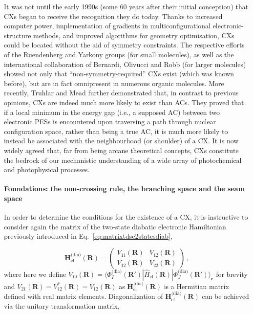 \documentclass[9pt,bestpractices]{livecoms}
\newcommand{\R}{\mathbf{R}}
\newcommand{\Rprime}{\mathbf{R'}}
\newcommand{\re}{\mathbf{r}}
\begin{document}
It was not until the early 1990s (some 60 years after their initial conception) that CXs began to receive the recognition they do today.\cite{domcke_front_2004}
Thanks to increased computer power, implementation of gradients in multiconfigurational electronic-structure methods, and improved algorithms for geometry optimisation, CXs could be located without the aid of symmetry constraints.\cite{lipkowitz_conical_2007}
The respective efforts of the Ruendenberg\cite{atchity_potential_1991, xantheas_potential_1991} and Yarkony\cite{riad_manaa_noncrossing_1990} groups (for small molecules), as well as the international collaboration of Bernardi, Olivucci and Robb\cite{bernardi_mechanism_1990, bernardi_predicting_1990} (for larger molecules) showed not only that ``non-symmetry-required'' CXs exist (which was known before), but are in fact omnipresent in numerous organic molecules.\cite{domcke_role_2012} 
More recently, Truhlar and Mead\cite{truhlar_relative_2003} further demonstrated that, in contrast to previous opinions, CXs are indeed much more likely to exist than ACs. 
They proved that if a local minimum in the energy gap (i.e., a supposed AC) between two electronic PESs is encountered upon traversing a path through nuclear configuration space, rather than being a true AC, it is much more likely to instead be associated with the neighbourhood (or shoulder) of a CX. 
It is now widely agreed that, far from being arcane theoretical concepts,\cite{zhu_non-adiabaticity_2016,boeije_one-mode_2023} CXs constitute the bedrock of our mechanistic understanding of a wide array of photochemical and photophysical processes.\cite{gonzalez2012progress,domcke_role_2012,gozem2017theory,10.1039/9781782626954-00016,blancafort_photochemistry_2014,levine2019conical}

\paragraph{Foundations: the non-crossing rule, the branching space and the seam space}
\label{ch2_non-cross_branch_seam}

In order to determine the conditions for the existence of a CX, it is instructive to consider again the matrix of the two-state diabatic electronic Hamiltonian previously introduced in Eq.~\eqref{eq:matrixtdse2statesdiab},\cite{matsika_electronic_2021} 

\begin{equation}
\label{dia_elec_ham}  
    \mathbf{H}_{\text{el}}^{\text{(dia)}}(\R) =
    \begin{pmatrix}
        V_{11}(\R) & V_{12}(\R) \\
        V_{12}(\R) & V_{22}(\R)
    \end{pmatrix} \, ,
\end{equation}
where here we define $V_{IJ}(\R) = \langle \Phi_I^{\text{(dia)}}(\Rprime) | \hat{H}_{\text{el}}(\R) | \Phi_J^{\text{(dia)}}(\Rprime) \rangle_{\re}$ for brevity and $V_{21}(\R) = V^*_{12}(\R) = V_{12}(\R)$ as $\mathbf{H}_{\text{el}}^{\text{(dia)}}(\R)$ is a Hermitian matrix defined with real matrix elements.
Diagonalization of $\mathbf{H}_{\text{el}}^{\text{(dia)}}(\R)$ can be achieved via the unitary transformation matrix,
\end{document}
